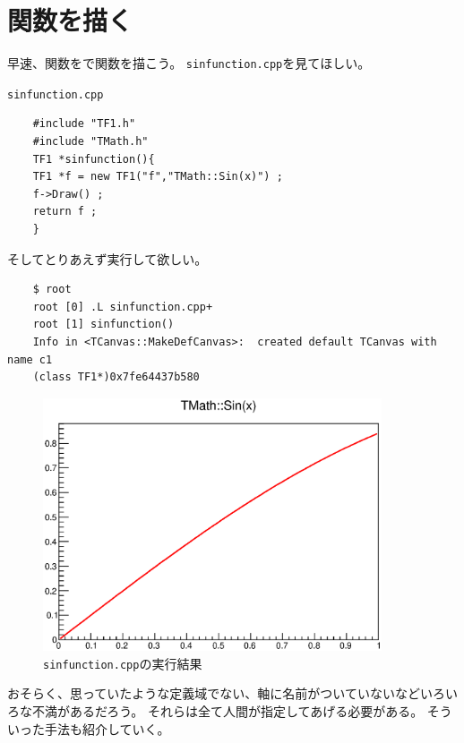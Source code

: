 
\clearpage
 \section{関数を描く}
 早速、関数を\ROOT で関数を描こう。
 \verb|sinfunction.cpp|を見てほしい。
 \begin{itembox}{\texttt{sinfunction.cpp}}
\begin{verbatim}
	#include "TF1.h"
	#include "TMath.h"
	TF1 *sinfunction(){
	TF1 *f = new TF1("f","TMath::Sin(x)") ;
	f->Draw() ;
	return f ;
	}
\end{verbatim}
 \end{itembox}
 そしてとりあえず実行して欲しい。
\begin{verbatim}
	$ root
	root [0] .L sinfunction.cpp+
	root [1] sinfunction()
	Info in <TCanvas::MakeDefCanvas>:  created default TCanvas with name c1
	(class TF1*)0x7fe64437b580
\end{verbatim}
\begin{figure}[htbp]
 \begin{center}
  \includegraphics[width = 100mm]{./picture/sinfunctioncanvas1.eps}
 \end{center}
 \caption{\texttt{sinfunction.cpp}の実行結果}
 \label{Fig:sinfunctioncanvas1}
\end{figure}
おそらく、思っていたような定義域でない、軸に名前がついていないなどいろいろな不満があるだろう。
それらは全て人間が指定してあげる必要がある。
そういった手法も紹介していく。



